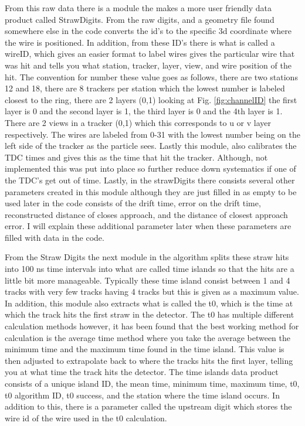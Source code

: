 \documentclass[./Thesis]{subfiles}
\begin{document}
	
	From this raw data there is a module the makes a more user friendly data product called StrawDigits. From the raw digits, and a geometry file found somewhere else in the code converts the id's to the specific 3d coordinate where the wire is positioned. In addition, from these ID's there is what is called a wireID, which gives an easier format to label wires gives the particular wire that was hit and tells you what station, tracker, layer, view, and wire position of the hit. The convention for number these value goes as follows, there are two stations 12 and 18, there are 8 trackers per station which the lowest number is labeled closest to the ring, there are 2 layers (0,1) looking at Fig. \ref{fig:channelID} the first layer is 0 and the second layer is 1, the third layer is 0 and the 4th layer is 1. There are 2 views in a tracker (0,1) which this corresponds to u or v layer respectively. The wires are labeled from 0-31 with the lowest number being on the left side of the tracker as the particle sees. Lastly this module, also calibrates the TDC times and gives this as the time that hit the tracker. Although, not implemented this was put into place so further reduce down systematics if one of the TDC's get out of time. Lastly, in the strawDigits there consists several other parameters created in this module although they are just filled in as empty to be used later in the code consists of the drift time,  error on the drift time, reconstructed distance of closes approach, and the distance of closest approach error. I will explain these additional parameter later when these parameters are filled with data in the code. 
	
	From the Straw Digits the next module in the algorithm splits these straw hits into 100 ns time intervals into what are called time islands so that the hits are a little bit more manageable. Typically these time island consist between 1 and 4 tracks with very few tracks having 4 tracks but this is given as a maximum value. In addition, this module also extracts what is called the t0, which is the time at which the track hits the first straw in the detector. The t0 has multiple different calculation methods however, it has been found that the best working method for calculation is the average time method where you take the average between the minimum time and the maximum time found in the time island. This value is then adjusted to extrapolate back to where the tracks hits the first layer, telling you at what time the track hits the detector. The time islands data product consists of a unique island ID, the mean time,  minimum time,  maximum time, t0, t0 algorithm ID, t0 success, and the station where the time island occurs. In addition to this, there is a parameter called the upstream digit which stores the wire id of the wire used in the t0 calculation.
	
\end{document}
